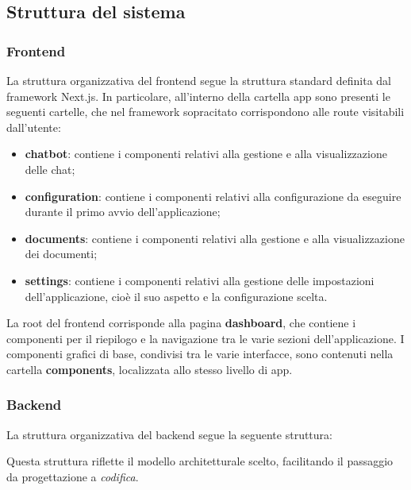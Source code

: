 \documentclass[10pt, a4paper]{article}
\begin{document}
\subsection{Struttura del sistema}

\subsubsection{Frontend}
La struttura organizzativa del frontend segue la struttura standard definita dal framework Next.js.
In particolare, all'interno della cartella app sono presenti le seguenti cartelle, che nel framework sopracitato corrispondono alle route visitabili dall'utente:
\begin{itemize}
    \item \textbf{chatbot}: contiene i componenti relativi alla gestione e alla visualizzazione delle chat;
    \item \textbf{configuration}: contiene i componenti relativi alla configurazione da eseguire durante il primo avvio dell'applicazione;
    \item \textbf{documents}: contiene i componenti relativi alla gestione e alla visualizzazione dei documenti;
    \item \textbf{settings}: contiene i componenti relativi alla gestione delle impostazioni dell'applicazione, cioè il suo aspetto e la configurazione scelta.
\end{itemize}
La root del frontend corrisponde alla pagina \textbf{dashboard}, che contiene i componenti per il riepilogo e la navigazione tra le varie sezioni dell'applicazione.
I componenti grafici di base, condivisi tra le varie interfacce, sono contenuti nella cartella \textbf{components}, localizzata allo stesso livello di app. 

\subsubsection{Backend}
La struttura organizzativa del backend segue la seguente struttura:

Questa struttura riflette il modello architetturale scelto, facilitando il passaggio da progettazione a \textit{codifica\pg}.


\newpage
\end{document}
